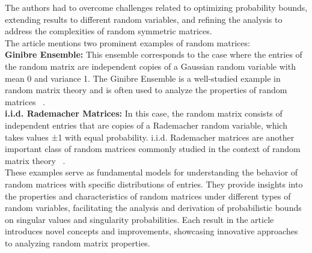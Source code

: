 The authors had to overcome challenges related to optimizing probability bounds, extending results to different random variables, and refining the analysis to address the complexities of random symmetric matrices.\\
The article mentions two prominent examples of random matrices:\\
\textbf{Ginibre Ensemble:} This ensemble corresponds to the case where the entries of the random matrix are independent copies of a Gaussian random variable with mean 0 and variance 1. The Ginibre Ensemble is a well-studied example in random matrix theory and is often used to analyze the properties of random matrices ~\cite{bourgain2010singularity}.\\
\textbf{i.i.d. Rademacher Matrices:} In this case, the random matrix consists of independent entries that are copies of a Rademacher random variable, which takes values ±1 with equal probability. i.i.d. Rademacher matrices are another important class of random matrices commonly studied in the context of random matrix theory ~\cite{bourgain2010singularity}.\\
These examples serve as fundamental models for understanding the behavior of random matrices with specific distributions of entries.
They provide insights into the properties and characteristics of random matrices under different types of random variables, facilitating the analysis and derivation of probabilistic bounds on singular values and singularity probabilities.
Each result in the article introduces novel concepts and improvements, showcasing innovative approaches to analyzing random matrix properties.
